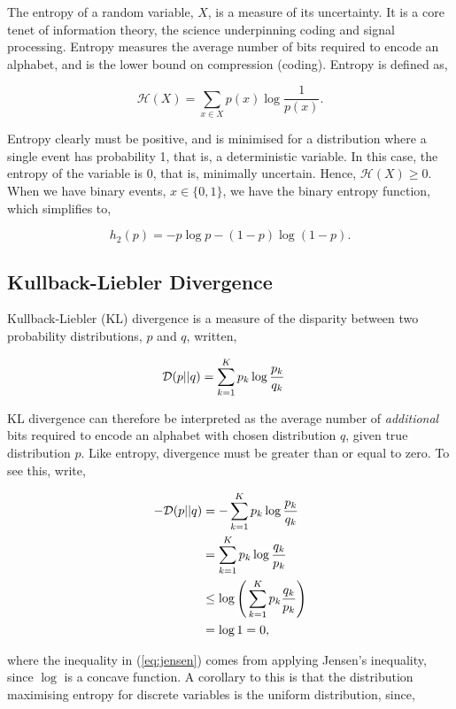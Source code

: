 \documentclass[11pt]{amsart}
\begin{document}
The entropy of a random variable, $X$, is a measure of its uncertainty. It is a core tenet of information theory, the science underpinning coding and signal processing. Entropy measures the average number of bits required to encode an alphabet, and is the lower bound on compression (coding). Entropy is defined as,

$$\mathcal{H}(X) = \sum_{x \in X}p(x)\log\frac{1}{p(x)}.$$

Entropy clearly must be positive, and is minimised for a distribution where a single event has probability 1, that is, a deterministic variable. In this case, the entropy of the variable is 0, that is, minimally uncertain. Hence, $\mathcal{H}(X) \geq 0$. When we have binary events, $x \in \{0, 1\}$, we have the binary entropy function, which simplifies to,

$$h_2(p) = -p\log p - (1-p)\log (1 - p).$$

\subsection{Kullback-Liebler Divergence}

Kullback-Liebler (KL) divergence is a measure of the disparity between two probability distributions, $p$ and $q$, written,

\begin{align}
\mathcal{D}(p || q) &= \sum_{k=1}^K p_k \log\frac{p_k}{q_k} \notag
\end{align}

KL divergence can therefore be interpreted as the average number of \emph{additional} bits required to encode an alphabet with chosen distribution $q$, given true distribution $p$. Like entropy, divergence must be greater than or equal to zero. To see this, write,

\begin{align}
-\mathcal{D}(p || q) &= -\sum_{k=1}^K p_k \log\frac{p_k}{q_k} \notag \\
&= \sum_{k=1}^K p_k \log\frac{q_k}{p_k} \notag \\
&\leq \log\Bigg(\sum_{k=1}^K p_k\frac{q_k}{p_k}\Bigg) \label{eq:jensen} \\
&= \log 1 = 0, \notag
\end{align}

where the inequality in (\ref{eq:jensen}) comes from applying Jensen's inequality, since $\log$ is a concave function. A corollary to this is that the distribution maximising entropy for discrete variables is the uniform distribution, since,
\end{document}

